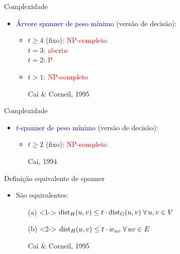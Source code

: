 \documentclass[dvipsnames]{beamer}
\newcommand{\dist}{{\rm dist}}
\begin{document}
\begin{frame}{Complexidade}
  \begin{itemize}
  \item \textcolor{blue}{Árvore spanner de peso mínimo} (versão de decisão):\\
      \begin{itemize}
      \item {$t \ge 4$ (fixo): \textcolor{red}{NP-completo}}\\
          {\makebox[3.3cm]{\hfill}$t = 3$: \textcolor{red}{aberto}}\\
          {\makebox[3.3cm]{\hfill}$t = 2$: \textcolor{red}{P}}\\
          \quad
        \item <2->{$t > 1$: \textcolor{red}{NP-completo}}\\
          \quad
          \item[] Cai \& Corneil, 1995
      \end{itemize}
  \end{itemize}
\end{frame}

\begin{frame}{Complexidade}
  \begin{itemize}
  \item \textcolor{blue}{$t$-spanner de peso mínimo} (versão de decisão):\\
    \begin{itemize}
    \item {$t \ge 2$ (fixo): \textcolor{red}{NP-completo}}\\
      \quad
    \item[] Cai, 1994
    \end{itemize}
  \end{itemize}
\end{frame}

\begin{frame}{Definição equivalente de spanner
  }
  \hypertarget{span}{}
  \begin{itemize}
  \item São equivalentes:
      \begin{itemize}
      \item[{\rm (a)}]<1-> $\dist_{H}(u,v) \le t \cdot \dist_{G}(u,v) \;\forall\,u,v \in V$\\
        \quad
      \item[{\rm (b)}]<2-> \textcolor{blue}{$\dist_{H}(u,v) \le t \cdot w_{uv} \;\forall\,uv \in E$}\\
        \quad
        \item[] Cai \& Corneil, 1995
        \end{itemize}
    \end{itemize}
\end{frame}
\end{document}
